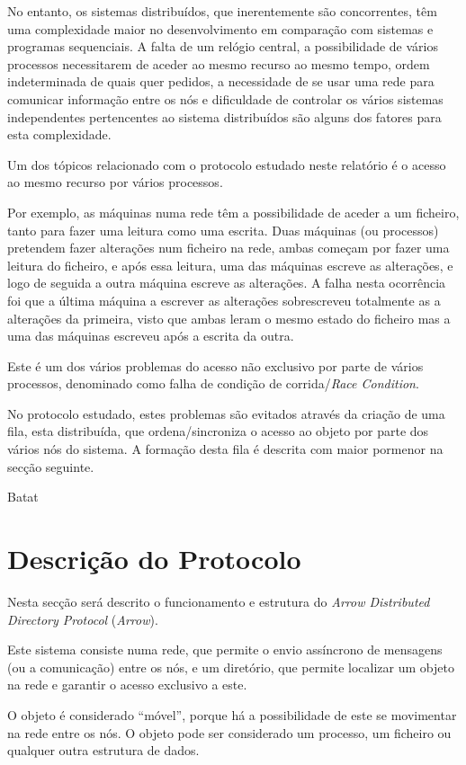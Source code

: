 No entanto, os sistemas distribuídos, que inerentemente são concorrentes, têm uma complexidade maior no desenvolvimento em comparação com sistemas e programas sequenciais.
A falta de um relógio central, a possibilidade de vários processos necessitarem de aceder ao mesmo recurso ao mesmo tempo, ordem indeterminada de quais quer pedidos, a necessidade de se usar uma rede para comunicar informação entre os nós e dificuldade de controlar os vários sistemas independentes pertencentes ao sistema distribuídos são alguns dos fatores para esta complexidade.

Um dos tópicos relacionado com o protocolo estudado neste relatório é o acesso ao mesmo recurso por vários processos.

Por exemplo, as máquinas numa rede têm a possibilidade de aceder a um ficheiro, tanto para fazer uma leitura como uma escrita.
Duas máquinas (ou processos) pretendem fazer alterações num ficheiro na rede, ambas começam por fazer uma leitura do ficheiro, e após essa leitura, uma das máquinas escreve as alterações, e logo de seguida a outra máquina escreve as alterações. A falha nesta ocorrência foi que a última máquina a escrever as alterações sobrescreveu totalmente as a alterações da primeira, visto que ambas leram o mesmo estado do ficheiro mas a uma das máquinas escreveu após a escrita da outra.

Este é um dos vários problemas do acesso não exclusivo por parte de vários processos, denominado como falha de condição de corrida/\emph{Race Condition}.

No protocolo estudado, estes problemas são evitados através da criação de uma fila, esta distribuída, que ordena/sincroniza o acesso ao objeto por parte dos vários nós do sistema.
A formação desta fila é descrita com maior pormenor na secção seguinte. 

Batat

\section{Descrição do Protocolo}

Nesta secção será descrito o funcionamento e estrutura do \textit{Arrow Distributed Directory Protocol} (\emph{Arrow}). 

Este sistema consiste numa rede, que permite o envio assíncrono de mensagens (ou a comunicação) entre os nós, e um diretório, que permite localizar um objeto na rede e garantir o acesso exclusivo a este. 

O objeto é considerado ``móvel'', porque há a possibilidade de este se movimentar na rede entre os nós.
O objeto pode ser considerado um processo, um ficheiro ou qualquer outra estrutura de dados.

